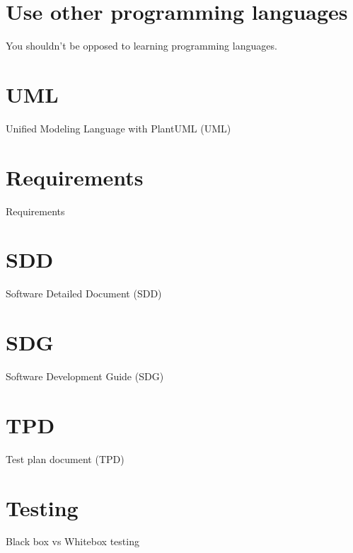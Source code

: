 \documentclass[10pt]{beamer}
\begin{document}
\section{Use other programming languages}
\begin{frame} {You shouldn't be opposed to learning programming languages.}

\end{frame}

\section{UML}
\begin{frame} {Unified Modeling Language with PlantUML (UML)}

\end{frame}

\section{Requirements}
\begin{frame} {Requirements}

\end{frame}

\section{SDD}
\begin{frame} {Software Detailed Document (SDD)}

\end{frame}

\section{SDG}
\begin{frame} {Software Development Guide (SDG)}

\end{frame}

\section{TPD}
\begin{frame} {Test plan document (TPD)}

\end{frame}

\section{Testing}
\begin{frame} {Black box vs Whitebox testing}

\end{frame}
\end{document}

